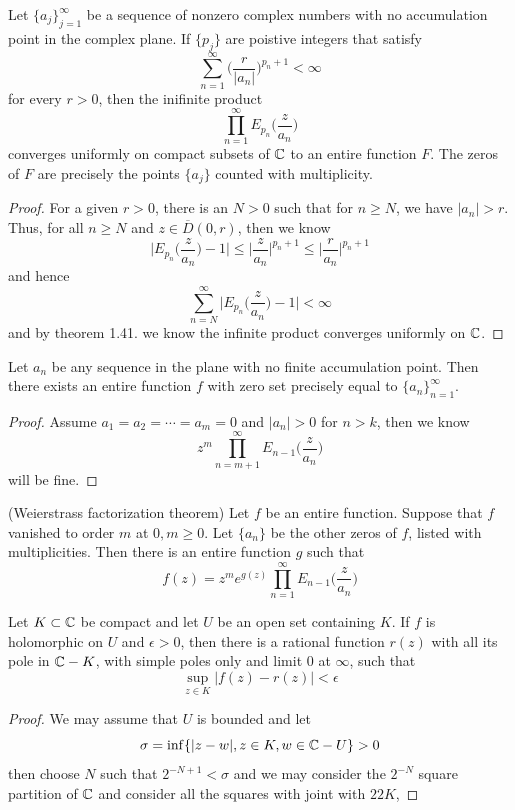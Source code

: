 \begin{theorem}
    Let $\{a_j\}_{j=1}^{\infty}$ be a sequence of nonzero complex numbers with no accumulation point in the complex plane. If $\{p_j\}$ are poistive integers that satisfy
    \[\sum\limits_{n=1}^{\infty}\Big(\dfrac{r}{|a_n|}\Big)^{p_n+1} < \infty\]
    for every $r>0$, then the inifinite product
    \[\prod_{n=1}^{\infty}E_{p_n}\Big(\dfrac{z}{a_n}\Big)\]
    converges uniformly on compact subsets of $\mathbb{C}$ to an entire function $F$. The zeros of $F$ are precisely the points $\{a_j\}$ counted with multiplicity.
\end{theorem}
\begin{proof}
    For a given $r>0$, there is an $N>0$ such that for $n\geq N$, we have $|a_n| > r$. Thus, for all $n \geq N$ and $z\in \overline{D}(0,r)$, then we know
    \[
    \Big|E_{p_n}\Big(\dfrac{z}{a_n}\Big) - 1\Big| \leq \Big|\dfrac{z}{a_n}\Big|^{p_n+1} \leq \Big|\dfrac{r}{a_n}\Big|^{p_n+1}
    \]
    and hence
    \[
    \sum\limits_{n=N}^{\infty} \Big|E_{p_n}\Big(\dfrac{z}{a_n}\Big) - 1\Big| < \infty
    \]
    and by theorem 1.41. we know the infinite product converges uniformly on $\mathbb{C}$.
\end{proof}

\begin{corollary}
    Let $a_n$ be any sequence in the plane with no finite accumulation point. Then there exists an entire function $f$ with zero set precisely equal to $\{a_n\}_{n=1}^{\infty}$.
\end{corollary}
\begin{proof}
    Assume $a_1 = a_2 = \cdots = a_m = 0$ and $|a_{n}| > 0$ for $n > k$, then we know
    \[
    z^m \prod_{n = m+1}^{\infty}E_{n-1}\Big(\dfrac{z}{a_n}\Big)
    \]
    will be fine.
\end{proof}

\begin{theorem}
    (Weierstrass factorization theorem) Let $f$ be an entire function. Suppose that $f$ vanished to order $m$ at $0, m\geq 0$. Let $\{a_n\}$ be the other zeros of $f$, listed with multiplicities. Then there is an entire function $g$ such that
    \[
    f(z) = z^m e^{g(z)} \prod_{n=1}^{\infty}E_{n-1}\Big(\dfrac{z}{a_n}\Big)
    \]
\end{theorem}

\begin{proposition}
    Let $K\subset \mathbb{C}$ be compact and let $U$ be an open set containing $K$. If $f$ is holomorphic on $U$ and $\epsilon > 0$, then there is a rational function $r(z)$ with all its pole in $\mathbb{C}- K$, with simple poles only and limit $0$ at $\infty$, such that
    \[
    \sup_{z\in K}|f(z)-r(z)| < \epsilon
    \]
\end{proposition}
\begin{proof}
    We may assume that $U$ is bounded and let
    \[
    \sigma = \inf\{|z-w|, z\in K, w\in \mathbb{C}-U\} > 0
    \]
    then choose $N$ such that $2^{-N+1} < \sigma$ and we may consider the $2^{-N}$ square partition of $\mathbb{C}$ and consider all the squares with joint with $22K$,
\end{proof}


